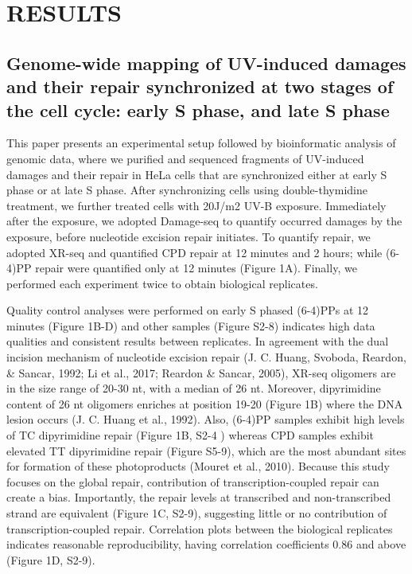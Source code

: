 \setlength{\parindent}{0pt}
\chapter{\bf RESULTS}

\section{Genome-wide mapping of UV-induced damages and their repair synchronized at two stages of the cell cycle: early S phase, and late S phase}

This paper presents an experimental setup followed by bioinformatic analysis of genomic data, where we purified and sequenced fragments of UV-induced damages and their repair in HeLa cells that are synchronized either at early S phase or at late S phase. After synchronizing cells using double-thymidine treatment, we further treated cells with 20J/m2 UV-B exposure. Immediately after the exposure, we adopted Damage-seq to quantify occurred damages by the exposure, before nucleotide excision repair initiates. To quantify repair, we adopted XR-seq and quantified CPD repair at 12 minutes and 2 hours; while (6-4)PP repair were quantified only at 12 minutes (Figure 1A). Finally, we performed each experiment twice to obtain biological replicates. 

Quality control analyses were performed on early S phased (6-4)PPs at 12 minutes (Figure 1B-D) and other samples (Figure S2-8) indicates high data qualities and consistent results between replicates. In agreement with the dual incision mechanism of nucleotide excision repair (J. C. Huang, Svoboda, Reardon, \& Sancar, 1992; Li et al., 2017; Reardon \& Sancar, 2005), XR-seq oligomers are in the size range of 20-30 nt, with a median of 26 nt. Moreover, dipyrimidine content of 26 nt oligomers enriches at position 19-20 (Figure 1B) where the DNA lesion occurs (J. C. Huang et al., 1992). Also, (6-4)PP samples exhibit high levels of TC dipyrimidine repair (Figure 1B, S2-4 ) whereas CPD samples exhibit elevated TT dipyrimidine repair (Figure S5-9), which are the most abundant sites for formation of these photoproducts (Mouret et al., 2010). Because this study focuses on the global repair, contribution of transcription-coupled repair can create a bias. Importantly, the repair levels at transcribed and non-transcribed strand are equivalent (Figure 1C, S2-9), suggesting little or no contribution of transcription-coupled repair. Correlation plots between the biological replicates indicates reasonable reproducibility, having correlation coefficients 0.86 and above (Figure 1D, S2-9). 

